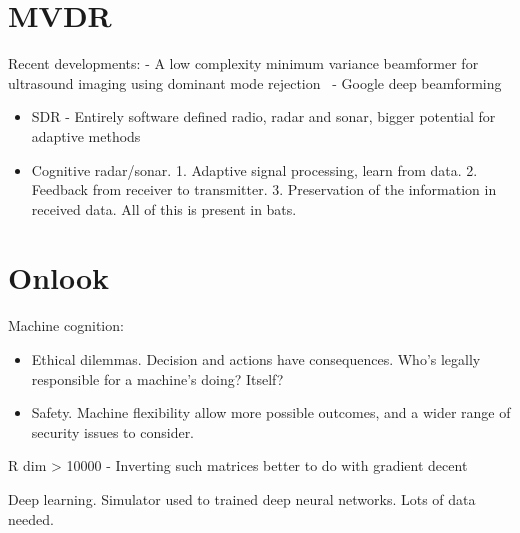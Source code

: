 %      
%      


\section{MVDR}

Recent developments:
- A low complexity minimum variance beamformer for ultrasound imaging using dominant mode rejection~\cite{Jiang2016}
- Google deep beamforming

\begin{itemize}
\item SDR - Entirely software defined radio, radar and sonar, bigger potential for adaptive methods
\item Cognitive radar/sonar. 1. Adaptive signal processing, learn from data. 2. Feedback from receiver to transmitter. 3. Preservation of the information in received data. All of this is present in bats.
\end{itemize}


\section{Onlook}

Machine cognition:
\begin{itemize}
\item Ethical dilemmas. Decision and actions have consequences. Who's legally responsible for a machine's doing? Itself?
\item Safety. Machine flexibility allow more possible outcomes, and a wider range of security issues to consider.
\end{itemize}

R dim > 10000
- Inverting such matrices better to do with gradient decent


Deep learning. Simulator used to trained deep neural networks. Lots of data needed.




\section{}


